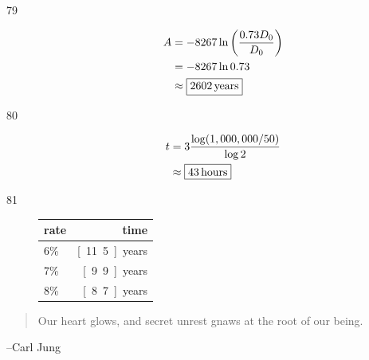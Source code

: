 \documentclass{exam}
\begin{document}
\begin{description}
    \item[79]
      \begin{align*}
        A &= -8267 \ln \left( \frac{0.73 D_0}{D_0} \right) \\
          &= -8267  \ln 0.73 \\
          &\approx \boxed{\unit[2602]{years}} \\
      \end{align*}

    \item[80]
      \begin{align*}
        t &= 3 \frac{\log(1,000,000 / 50)}{\log 2} \\
          &\approx \boxed{\unit[43]{hours}} \\
      \end{align*}

    \item[81]
      \begin{tabular}[H]{lr}
        \toprule
        rate & time \\
        \midrule
        6\% & \unit[11.5]{years} \\
        7\% & \unit[9.9]{years} \\
        8\% & \unit[8.7]{years} \\
        \bottomrule
      \end{tabular}
    \end{description}

  \else
    \vspace{2 cm}
    \begin{quote}
      \begin{em}
        Our heart glows, and secret unrest gnaws at the root of our being.
      \end{em}
    \end{quote}

    \hspace{1 cm} --Carl Jung
  \fi
\end{document}

